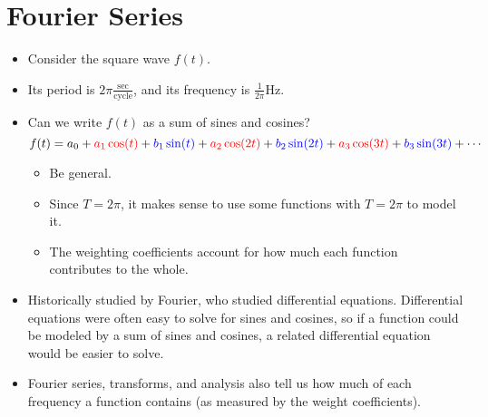 \documentclass{article}
\begin{document}
\section*{Fourier Series}
\begin{itemize}
    \item {}Consider the square wave $f(t)$.
    \begin{center}
    \end{center}
    \item Its period is $2\pi\frac{\text{sec}}{\text{cycle}}$, and its frequency is $\frac{1}{2\pi} \text{Hz}$.
    \item Can we write $f(t)$ as a sum of sines and cosines?
    \begin{equation*}
        f(t) = a_0+{\color{red}a_1\cos(t)}+{\color{blue}b_1\sin(t)}+{\color{red}a_2\cos(2t)}+{\color{blue}b_2\sin(2t)}+{\color{red}a_3\cos(3t)}+{\color{blue}b_3\sin(3t)}+\cdots
    \end{equation*}
    \begin{itemize}
        \item Be general.
        \item Since $T=2\pi$, it makes sense to use some functions with $T=2\pi$ to model it.
        \item The weighting coefficients account for how much each function contributes to the whole.
    \end{itemize}
    \item Historically studied by Fourier, who studied differential equations. Differential equations were often easy to solve for sines and cosines, so if a function could be modeled by a sum of sines and cosines, a related differential equation would be easier to solve.
    \item Fourier series, transforms, and analysis also tell us how much of each frequency a function contains (as measured by the weight coefficients).
\end{itemize}
\end{document}
